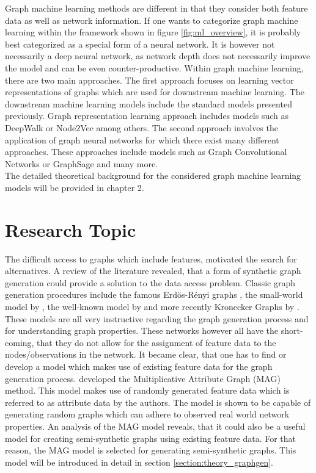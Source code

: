 	\noindent Graph machine learning methods are different in that they consider 
	both feature data as well as network information. If one wants to categorize 
	graph machine learning within the framework shown in figure 
	\ref{fig:ml_overview}, it is probably best categorized as a special form of 
	a neural network. It is however not necessarily a deep neural network, as 
	network depth does not necessarily improve the model and can be even 
	counter-productive. Within graph machine learning, there are two main
	approaches. The first approach focuses on learning vector representations
	of graphs which are used for downstream machine learning. The downstream
	machine learning models include the standard models presented previously. 
	Graph representation learning approach includes models such as DeepWalk 
	\citep{perozzi2014deepwalk} or Node2Vec \citep{grover2016node2vec} among 
	others. The second approach involves the application of graph neural 
	networks for which there exist many different approaches. These approaches 
	include models such as Graph Convolutional Networks \citep{kipf2016semi} or 
	GraphSage \citep{hamilton2017inductive} and many more. \\

	\noindent The detailed theoretical background for the considered graph
	machine learning models will be provided in chapter 2.

	\section{Research Topic}
	\label{section:research_topics}

	\noindent The difficult access to graphs which include features, motivated 
	the search for alternatives. A review of the literature revealed, that a 
	form of synthetic graph generation could provide a solution to the data 
	access problem. Classic graph generation procedures include the famous 
	Erdös-Rényi graphs \citeyearpar{erdos1959random}, the small-world model by 
	\cite{watts1998collective}, the well-known model by 
	\cite{barabasi1999emergence} and more recently Kronecker Graphs by
	\cite{leskovec2010kronecker}. These models are all very instructive
	regarding the graph generation process and for understanding graph
	properties. These networks however all have the short-coming, that they do 
	not allow for the assignment of feature data to the nodes/observations in the
	network. It became clear, that one has to find or develop a model which 
	makes use of existing feature data for the graph generation process. 
	\cite{kim2012multiplicative} developed the Multiplicative Attribute 
	Graph (MAG) method. This model makes use of randomly generated feature data 
	which is referred to as attribute data by the authors. The model is shown
	to be capable of generating random graphs which can adhere to observed real 
	world network properties. An analysis of the MAG model reveals, that it 
	could also be a useful model for creating semi-synthetic graphs using 
	existing feature data. For that reason, the MAG model is selected for 
	generating semi-synthetic graphs. This model will be introduced in detail 
	in section \ref{section:theory_graphgen}. \\

